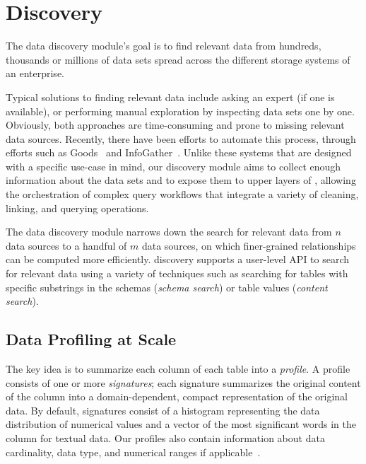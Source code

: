 \section{Discovery}
\label{sec:discovery}

The data discovery module's goal is to find relevant data from hundreds, thousands or
 millions of data sets  spread across the different storage systems of an
enterprise.

Typical solutions to finding relevant data include asking an expert (if one is available), or  performing
manual exploration by inspecting data sets one by one.  Obviously, both approaches are
time-consuming and prone to missing relevant data sources.  
Recently, there have been efforts to automate this process, through efforts such as
Goods~\cite{DBLP:conf/sigmod/HalevyKNOPRW16} and 
InfoGather~\cite{DBLP:conf/sigmod/YakoutGCC12}.   Unlike these systems
that are designed with a specific use-case in mind, our discovery module aims to
collect enough information about the data sets and to expose them to upper layers
of \dcv, allowing the orchestration of complex query workflows that integrate a variety of cleaning, linking, and querying operations.

The data discovery module narrows down the search for relevant data from
$n$ data sources to a handful of $m$ data sources, on which finer-grained relationships can be computed more efficiently.
\dcv discovery supports a user-level API to search for relevant data using a
variety of techniques such as searching for tables with specific substrings in the schemas ({\it schema search}) or table values ({\it content search}). 

\subsection{Data Profiling at Scale}

The key idea   is to summarize each column of each table into a {\em profile}.
A profile consists of one or more {\it signatures};  each signature summarizes the original content of the column into a domain-dependent,
compact representation of the original data.  By default, signatures consist of a histogram representing the
data distribution of numerical values and  a vector of the most significant words
in the column for textual data.  Our profiles also contain information about data cardinality,
data type, and numerical ranges if applicable~\cite{profiling_survey}.

